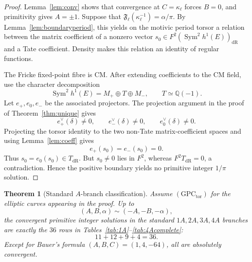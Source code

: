 \documentclass[11pt,a4paper]{amsart} %
\newtheorem{theorem}{Theorem}[section]
\theoremstyle{definition}
\newcommand{\Q}{\mathbb Q}
\newcommand{\Sym}{\operatorname{Sym}}
\newcommand{\dR}{\mathrm{dR}}
\begin{document}
\begin{proof}
Lemma~\ref{lem:conv} shows that convergence at \(C=\kappa_\ell\) forces
\(B=0\), and primitivity gives \(A=\pm1\). Suppose that
\({\mathfrak F}_\ell(\kappa_\ell^{-1})=\alpha/\pi\). By
Lemma~\ref{lem:boundaryperiod}, this yields on the motivic period torsor a
relation between the matrix coefficient of a nonzero vector
\(s_0\in F^2(\Sym^2h^1(E))_{\dR}\) and a Tate coefficient. Density makes
this relation an identity of regular functions.

The Fricke fixed-point fibre is CM. After extending coefficients to the CM
field, use the character decomposition
\[
\Sym^2h^1(E)=M_+\oplus T\oplus M_-,
\qquad
T\simeq\Q(-1).
\]
Let \(e_+,e_0,e_-\) be the associated projectors. The projection argument in
the proof of Theorem~\ref{thm:unique} gives
\[
e_+^\vee(\delta)\ne0,
\qquad e_-^\vee(\delta)\ne0,
\qquad e_0^\vee(\delta)\ne0.
\]
Projecting the torsor identity to the two non-Tate matrix-coefficient spaces
and using Lemma~\ref{lem:coeff} gives
\[
e_+(s_0)=e_-(s_0)=0.
\]
Thus \(s_0=e_0(s_0)\in T_{\dR}\). But
\(s_0\ne0\) lies in \(F^2\), whereas \(F^2T_{\dR}=0\), a contradiction.
Hence the positive boundary yields no primitive integer \(1/\pi\) solution.
\end{proof}

\begin{theorem}[Standard \(A\)-branch classification]\label{thm:Acomplete}
Assume \((\mathrm{GPC}_{\mathrm{tor}})\) for the elliptic curves appearing in
the proof. Up to
\[
(A,B,\alpha)\sim(-A,-B,-\alpha),
\]
the convergent primitive integer solutions in the standard
\(1A,2A,3A,4A\) branches are exactly the \(36\) rows in
Tables~\ref{tab:1A}--\ref{tab:4Acomplete}:
\[
11+12+9+4=36.
\]
Except for Bauer's formula \((A,B,C)=(1,4,-64)\), all are absolutely
convergent.
\end{theorem}
\end{document}
